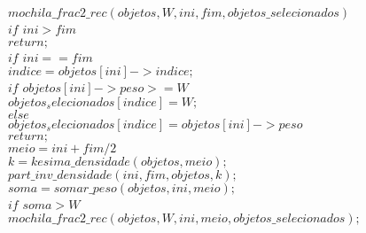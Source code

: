 \documentclass[10pt,a4paper]{article}
\begin{document}
	
	$mochila\_frac2\_rec(objetos,W,ini,fim, objetos\_selecionados)$\\

	\hspace{1cm}$if$ $ini > fim$\\

	\hspace{2cm}$return;$\\
	

	\hspace{1cm}$if$ $ini == fim$\\

	\hspace{2cm}$indice = objetos[ini]->indice;$\\
	
	\hspace{1cm}$if$ $objetos[ini]->peso >= W$\\
	
	\hspace{3cm}$objetos_selecionados[indice] = W;$\\
	
	\hspace{2cm}$else$\\
	
	\hspace{3cm}$objetos_selecionados[indice] =objetos[ini]->peso $\\
	
	\hspace{2cm}$return;$\\
	
	\hspace{1cm}$meio = ini+fim/2$\\
	
	\hspace{1cm}$k = kesima\_densidade(objetos, meio);$\\
	
	\hspace{1cm}$part\_inv\_densidade(ini,fim,objetos,k);$\\
	
	\hspace{1cm}$soma = somar\_peso(objetos,ini,meio);$\\
	
	\hspace{1cm}$if$ $soma > W$\\
	
	\hspace{2cm}$mochila\_frac2\_rec(objetos,W,ini, meio, objetos\_selecionados);$\\
	
\end{document}
